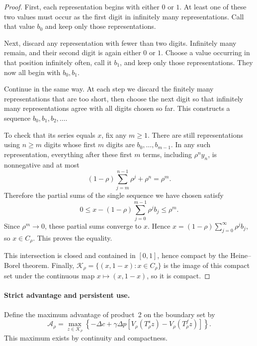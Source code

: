 \documentclass[11pt]{article}
\begin{document}
\begin{proof}
First, each representation begins with either $0$ or $1$. At least one
of these two values must occur as the first digit in infinitely many
representations. Call that value $b_0$ and keep only those representations.

Next, discard any representation with fewer than two digits. Infinitely
many remain, and their second digit is again either $0$ or $1$. Choose
a value occurring in that position infinitely often, call it $b_1$,
and keep only those representations. They now all begin with $b_0,b_1$.

Continue in the same way. At each step we discard the finitely many
representations that are too short, then choose the next digit so that
infinitely many representations agree with all digits chosen so far.
This constructs a sequence $b_0,b_1,b_2,\ldots$.

To check that its series equals $x$, fix any $m\geq1$. There are still
representations using $n\geq m$ digits whose first $m$ digits are
$b_0,\ldots,b_{m-1}$. In any such representation, everything after
these first $m$ terms, including $\rho^n y_n$, is nonnegative and at most
\begin{equation*}
(1-\rho)\sum_{j=m}^{n-1}\rho^j+\rho^n=\rho^m.
\end{equation*}
Therefore the partial sums of the single sequence we have chosen satisfy
\begin{equation*}
0\leq x-(1-\rho)\sum_{j=0}^{m-1}\rho^j b_j\leq\rho^m.
\end{equation*}
Since $\rho^m\to0$, these partial sums converge to $x$. Hence
$x=(1-\rho)\sum_{j=0}^{\infty}\rho^j b_j$, so $x\in C_\rho$.
This proves the equality.

This intersection is closed and contained in $[0,1]$, hence compact by
the Heine--Borel theorem. Finally,
$\mathcal K_\rho=\{(x,1-x):x\in C_\rho\}$ is the image of this compact
set under the continuous map $x\mapsto(x,1-x)$, so it is compact.
\end{proof}

\paragraph{Strict advantage and persistent use.}
Define the maximum advantage of product~2 on the boundary set by
\begin{equation}
\mathcal A_\rho=\max_{z\in\mathcal K_\rho}
\left\{-\Delta c+\gamma\Delta p
\left[V_\rho(T_\rho^s z)-V_\rho(T_\rho^f z)\right]\right\}.
\end{equation}
This maximum exists by continuity and compactness.
\end{document}
